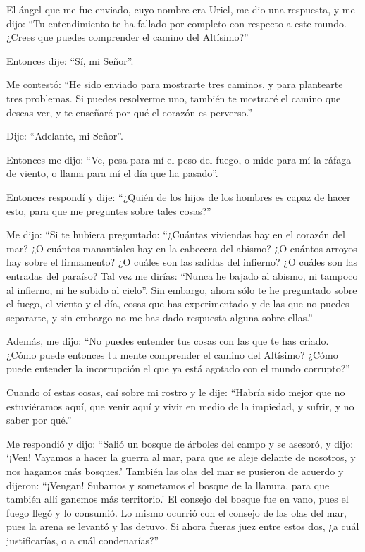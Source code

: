  El ángel que me fue enviado, cuyo nombre era Uriel, me
dio una respuesta,  y me dijo: ``Tu entendimiento te ha
fallado por completo con respecto a este mundo. ¿Crees que puedes
comprender el camino del Altísimo?''

 Entonces dije: ``Sí, mi Señor''.

Me contestó: ``He sido enviado para mostrarte tres caminos, y para
plantearte tres problemas.  Si puedes resolverme uno,
también te mostraré el camino que deseas ver, y te enseñaré por qué el
corazón es perverso.''

 Dije: ``Adelante, mi Señor''.

Entonces me dijo: ``Ve, pesa para mí el peso del fuego, o mide para mí
la ráfaga de viento, o llama para mí el día que ha pasado''.

 Entonces respondí y dije: ``¿Quién de los hijos de los
hombres es capaz de hacer esto, para que me preguntes sobre tales
cosas?''

 Me dijo: ``Si te hubiera preguntado: ``¿Cuántas viviendas
hay en el corazón del mar? ¿O cuántos manantiales hay en la cabecera del
abismo? ¿O cuántos arroyos hay sobre el firmamento? ¿O cuáles son las
salidas del infierno? ¿O cuáles son las entradas del paraíso?
 Tal vez me dirías: ``Nunca he bajado al abismo, ni
tampoco al infierno, ni he subido al cielo''.  Sin
embargo, ahora sólo te he preguntado sobre el fuego, el viento y el día,
cosas que has experimentado y de las que no puedes separarte, y sin
embargo no me has dado respuesta alguna sobre ellas.''

 Además, me dijo: ``No puedes entender tus cosas con las
que te has criado.  ¿Cómo puede entonces tu mente
comprender el camino del Altísimo? ¿Cómo puede entender la incorrupción
el que ya está agotado con el mundo corrupto?''

Cuando oí estas cosas, caí sobre mi rostro  y le dije:
``Habría sido mejor que no estuviéramos aquí, que venir aquí y vivir en
medio de la impiedad, y sufrir, y no saber por qué.''

 Me respondió y dijo: ``Salió un bosque de árboles del
campo y se asesoró,  y dijo: `¡Ven! Vayamos a hacer la
guerra al mar, para que se aleje delante de nosotros, y nos hagamos más
bosques.'  También las olas del mar se pusieron de
acuerdo y dijeron: ``¡Vengan! Subamos y sometamos el bosque de la
llanura, para que también allí ganemos más territorio.' 
El consejo del bosque fue en vano, pues el fuego llegó y lo consumió.
 Lo mismo ocurrió con el consejo de las olas del mar,
pues la arena se levantó y las detuvo.  Si ahora fueras
juez entre estos dos, ¿a cuál justificarías, o a cuál condenarías?''

